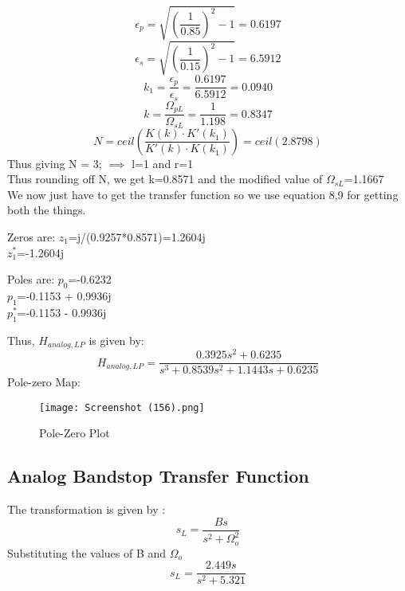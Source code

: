 \documentclass{article}
\begin{document}
\begin{equation*}
    \epsilon_p=\sqrt{(\frac{1}{0.85})^2-1}=0.6197 
\end{equation*}
\begin{equation*}
    \epsilon_s=\sqrt{(\frac{1}{0.15})^2-1}=6.5912 
\end{equation*}
\begin{equation*}
    k_1 = \frac{\epsilon_p}{\epsilon_s} = \frac{0.6197}{6.5912}=0.0940
\end{equation*}
\begin{equation*}
    k = \frac{\Omega_{pL}}{\Omega_{sL}} = \frac{1}{1.198} = 0.8347
\end{equation*}
\begin{equation*}
N = ceil({\frac{K(k)\cdot K'(k_1)}{K'(k)\cdot K(k_1)}}) = ceil(2.8798)
\end{equation*}
Thus giving N = 3; $\implies$ l=1 and r=1\\

Thus rounding off N, we get k=0.8571 and the modified value of $\Omega_{sL}$=1.1667\\

We now just have to get the transfer function so we use equation 8,9 for getting both the things.\\
\begin{center}
Zeros are:
$z_1$=j/(0.9257*0.8571)=1.2604j\\
$z_1^*$=-1.2604j \\
\end{center}
\begin{center}
Poles are:
$p_0$=-0.6232 \\
$p_1$=-0.1153 + 0.9936j \\
$p_1^*$=-0.1153 - 0.9936j \\
\end{center}

Thus, $H_{analog,LP}$ is given by:
\begin{equation*}
    H_{analog,LP} = \frac{0.3925s^2 + 0.6235}{s^3 + 0.8539s^2 + 1.1443s + 0.6235}
\end{equation*}
Pole-zero Map:
\begin{figure}[H]
    \centering
    \texttt{[image: Screenshot (156).png]}
    \caption{Pole-Zero Plot}
    \label{fig:my_label}
\end{figure}
\subsection{Analog Bandstop Transfer Function}
The transformation is given by :
\begin{equation*}
    s_L = \frac{Bs}{s^2 + \Omega_o^2 }
\end{equation*}
Substituting the values of B and $\Omega_o$
\begin{equation*}
    s_L = \frac{2.449s}{s^2 + 5.321}
\end{equation*}
\end{document}
